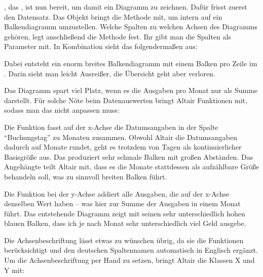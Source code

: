 \medskip


, das , ist nun bereit, um damit ein Diagramm zu zeichnen. Dafür frisst zuerst  den Datensatz. Das Objekt bringt die Methode  mit, um intern auf ein Balkendiagramm umzustellen. Welche Spalten zu welchen Achsen des Diagramms gehören, legt anschließend die Methode  fest. Ihr gibt man die Spalten als Parameter mit. In Kombination sieht das folgendermaßen aus:


\medskip


\medskip


Dabei entsteht ein enorm breites Balkendiagramm mit einem Balken pro Zeile im . Darin sieht man leicht Ausreißer, die Übersicht geht aber verloren.

Das Diagramm spart viel Platz, wenn es die Ausgaben pro Monat nur als Summe darstellt. Für solche Nöte beim Datenauswerten bringt Altair Funktionen mit, sodass man das  nicht anpassen muss:

\medskip





\medskip



Die Funktion  fasst auf der x-Achse die Datumsangaben in der Spalte ``Buchungstag'' zu Monaten zusammen. Obwohl Altair die Datumsangaben dadurch auf Monate rundet, geht es trotzdem von Tagen als kontinuierlicher Basisgröße aus. Das produziert sehr schmale Balken mit großen Abständen. Das Angehängte  teilt Altair mit, dass es die Monate stattdessen als aufzählbare Größe behandeln soll, was zu sinnvoll breiten Balken führt.

Die Funktion  bei der y-Achse addiert alle Ausgaben, die auf der x-Achse denselben Wert haben -- was hier zur Summe der Ausgaben in einem Monat führt. Das entstehende Diagramm zeigt mit seinen sehr unterschiedlich hohen blauen Balken, dass ich je nach Monat sehr unterschiedlich viel Geld ausgebe.

Die Achsenbeschriftung lässt etwas zu wünschen übrig, da sie die Funktionen berücksichtigt und den deutschen Spaltennamen automatisch in Englisch ergänzt. Um die Achsenbeschriftung per Hand zu setzen, bringt Altair die Klassen X und Y mit:

